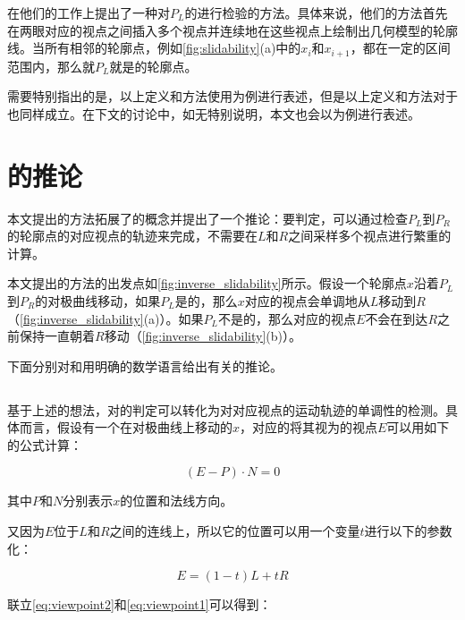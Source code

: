 \citeauthor{kim2013stereoscopic}在他们的工作上提出了一种对$P_L$的\epsl{}进行检验的方法。具体来说，他们的方法首先在两眼对应的视点之间插入多个视点并连续地在这些视点上绘制出几何模型的轮廓线。当所有相邻的轮廓点，例如\autoref{fig:slidability}(a)中的$x_i$和$x_{i+1}$，都在一定的区间范围内，那么就$P_L$就是\epslb{}的轮廓点。

需要特别指出的是，以上定义和方法使用\con{}为例进行表述，但是以上定义和方法对于\scon{}也同样成立。在下文的讨论中，如无特别说明，本文也会以\con{}为例进行表述。

\section{\epsl{}的推论}

本文提出的方法拓展了\epsl{}的概念并提出了一个推论：要判定\epsl{}，可以通过检查$P_L$到$P_R$的轮廓点的对应视点的轨迹来完成，不需要在$L$和$R$之间采样多个视点进行繁重的计算。

本文提出的方法的出发点如\autoref{fig:inverse_slidability}所示。假设一个轮廓点$x$沿着$P_L$到$P_R$的对极曲线移动，如果$P_L$是\epslb{}的，那么$x$对应的视点会单调地从$L$移动到$R$（\autoref{fig:inverse_slidability}(a)）。如果$P_L$不是\epslb{}的，那么对应的视点$E$不会在到达$R$之前保持一直朝着$R$移动（\autoref{fig:inverse_slidability}(b)）。

下面分别对\con{}和\scon{}用明确的数学语言给出有关\epsl{}的推论。

\subsection{\con{}}

基于上述的想法，对\epsl{}的判定可以转化为对对应视点的运动轨迹的单调性的检测。具体而言，假设有一个在对极曲线上移动的\conp{}$x$，对应的将其视为\conp{}的视点$E$可以用如下的公式计算：

\begin{equation}\label{eq:viewpoint2}
    {(E - P)}\cdot{N} = 0
\end{equation}

其中$P$和$N$分别表示\conp{}$x$的位置和法线方向。

又因为$E$位于$L$和$R$之间的连线上，所以它的位置可以用一个变量$t$进行以下的参数化：

\begin{equation}\label{eq:viewpoint1}
    E = (1-t)L+t R
\end{equation}

联立\autoref{eq:viewpoint2}和\autoref{eq:viewpoint1}可以得到：


